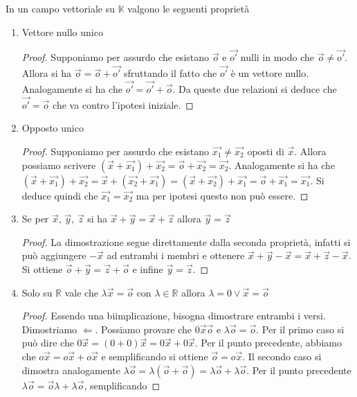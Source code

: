 In un campo vettoriale su $\mathbb{K}$ valgono le seguenti proprietà
\begin{enumerate}
  \item Vettore nullo unico
    \begin{proof}
      Supponiamo per assurdo che esistano $\vec{o}$ e $\vec{o'}$ nulli in modo che
      $\vec{o}\neq\vec{o'}$. Allora si ha $\vec{o}=\vec{o}+\vec{o'}$ sfruttando il fatto
      che $\vec{o'}$ è un vettore nullo. Analogamente si ha che
      $\vec{o'}=\vec{o'}+\vec{o}$. Da queste due relazioni si deduce che
      $\vec{o'}=\vec{o}$ che va contro l'ipotesi iniziale.
    \end{proof}
  \item Opposto unico
    \begin{proof}
      Supponiamo per assurdo che esistano $\vec{x_1}\neq\vec{x_2}$ oposti di $\vec{x}$.
      Allora possiamo scrivere $(\vec{x}+\vec{x_1})+\vec{x_2} =
      \vec{o}+\vec{x_2}=\vec{x_2}$. Analogamente si ha che
      $(\vec{x}+\vec{x_1})+\vec{x_2}=\vec{x}+(\vec{x_2}+\vec{x_1})=(\vec{x}+\vec{x_2})
      +\vec{x_1}=\vec{o}+\vec{x_1}=\vec{x_1}$. Si deduce quindi che
      $\vec{x_1}=\vec{x_2}$ ma per ipotesi questo non può essere.
    \end{proof}
  \item Se per $\vec{x}$, $\vec{y}$, $\vec{z}$ si ha $\vec{x}+\vec{y}=\vec{x}+\vec{z}$
    allora $\vec{y}=\vec{z}$
    \begin{proof}
      La dimostrazione segue direttamente dalla seconda proprietà, infatti si può
      aggiungere $-\vec{x}$ ad entrambi i membri e ottenere
      $\vec{x}+\vec{y}-\vec{x}=\vec{x}+\vec{z}-\vec{x}$. Si ottiene
      $\vec{o}+\vec{y}=\vec{z}+\vec{o}$ e infine $\vec{y}=\vec{z}$.
    \end{proof}
  \item Solo su $\mathbb{R}$ vale che $\lambda\vec{x}=\vec{o}$ con
    $\lambda\in\mathbb{R}$ allora $\lambda=0\lor\vec{x}=\vec{o}$
    \begin{proof}
      Essendo una biimplicazione, bisogna dimostrare entrambi i versi. Dimostriamo
      $\Leftarrow$. Possiamo provare che $0\vec{x}\vec{o}$ e $\lambda\vec{o}=\vec{o}$.
      Per il primo caso si può dire che $0\vec{x}=(0+0)\vec{x}=0\vec{x}+0\vec{x}$. Per
      il punto precedente, abbiamo che $o\vec{x}=o\vec{x}+o\vec{x}$ e semplificando si
      ottiene $\vec{o}=o\vec{x}$. Il secondo caso si dimostra analogamente
      $\lambda\vec{o}=\lambda(\vec{o}+\vec{o})=\lambda\vec{o}+\lambda\vec{o}$. Per il
      punto precedente $\lambda\vec{o}=\vec{o}\lambda+\lambda\vec{o}$, semplificando

\end{proof}
\end{enumerate}

